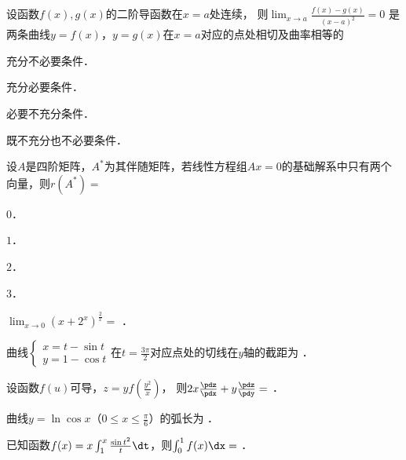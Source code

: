 \documentclass[plain,noanswer,medmath]{../../template/jnuexam}
\begin{document}
\begin{problem}
设函数$f(x),g(x)$的二阶导函数在$x = a$处连续，
则$\lim_{x \to a} \frac{f(x) - g(x)}{(x - a)^2} = 0$
是两条曲线$y = f(x)$，$y = g(x)$在$x = a$对应的点处相切及曲率相等的\pickout{}
\begin{abcd}
\item 充分不必要条件．
\item 充分必要条件．
\item 必要不充分条件．
\item 既不充分也不必要条件．
\end{abcd}
\end{problem}


\begin{problem}
设$A$是四阶矩阵，$A^*$为其伴随矩阵，若线性方程组$Ax = 0$的基础解系中只有两个向量，则$r(A^*) =$\pickout{}
\begin{abcd}
\item $0$．
\item $1$．
\item $2$．
\item $3$．
\end{abcd}
\end{problem}






\begin{problem}
$\lim_{x \to 0} \left(x + 2^x \right)^{\frac{2}{x}} =$ \fillin{}．
\end{problem}


\begin{problem}
曲线$\begin{cases}
  x = t - \sin t \\
  y = 1 - \cos t
\end{cases}$在$t = \frac{3\pi}{2}$对应点处的切线在$y$轴的截距为 \fillin{}．
\end{problem}


\begin{problem}
设函数$f(u)$可导，$z = yf\left(\frac{y^2}{x} \right)$，
则$2x\frac{\pdz}{\pdx} + y\frac{\pdz}{\pdy} =$ \fillin{}．
\end{problem}


\begin{problem}
曲线$y = \ln \cos x$（$0 \le x \le \frac{\pi}{6}$）的弧长为 \fillin{}．
\end{problem}


\begin{problem}
已知函数$f(x) = x\int_1^x \frac{\sin t^2}{t} \dt$，则$\int_0^1 f(x)\dx =$ \fillin{}．
\end{problem}
\end{document}
